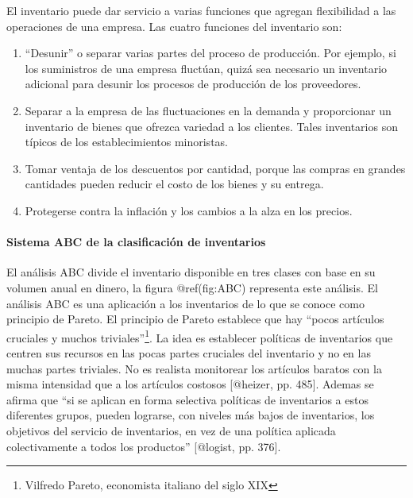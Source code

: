 \documentclass[11pt]{article}
\providecommand{\tightlist}{%
      \setlength{\itemsep}{0pt}\setlength{\parskip}{0pt}}
\begin{document}
El inventario puede dar servicio a varias funciones que agregan
flexibilidad a las operaciones de una empresa. Las cuatro funciones del
inventario son:

\begin{enumerate}
\def\labelenumi{\arabic{enumi}.}
\tightlist
\item
  ``Desunir'' o separar varias partes del proceso de producción. Por
  ejemplo, si los suministros de una empresa fluctúan, quizá sea
  necesario un inventario adicional para desunir los procesos de
  producción de los proveedores.
\item
  Separar a la empresa de las fluctuaciones en la demanda y proporcionar
  un inventario de bienes que ofrezca variedad a los clientes. Tales
  inventarios son típicos de los establecimientos minoristas.
\item
  Tomar ventaja de los descuentos por cantidad, porque las compras en
  grandes cantidades pueden reducir el costo de los bienes y su entrega.
\item
  Protegerse contra la inflación y los cambios a la alza en los precios.
\end{enumerate}

\hypertarget{sistema-abc-de-la-clasificaciuxf3n-de-inventarios}{%
\paragraph{Sistema ABC de la clasificación de
inventarios}\label{sistema-abc-de-la-clasificaciuxf3n-de-inventarios}}

El análisis ABC divide el inventario disponible en tres clases con base
en su volumen anual en dinero, la figura @ref(fig:ABC) representa este
análisis. El análisis ABC es una aplicación a los inventarios de lo que
se conoce como principio de Pareto. El principio de Pareto establece que
hay ``pocos artículos cruciales y muchos triviales''\footnote{Vilfredo
  Pareto, economista italiano del siglo XIX}. La idea es establecer
políticas de inventarios que centren sus recursos en las pocas partes
cruciales del inventario y no en las muchas partes triviales. No es
realista monitorear los artículos baratos con la misma intensidad que a
los artículos costosos {[}@heizer, pp. 485{]}. Ademas se afirma que ``si
se aplican en forma selectiva políticas de inventarios a estos
diferentes grupos, pueden lograrse, con niveles más bajos de
inventarios, los objetivos del servicio de inventarios, en vez de una
política aplicada colectivamente a todos los productos'' {[}@logist, pp.
376{]}.
\end{document}
